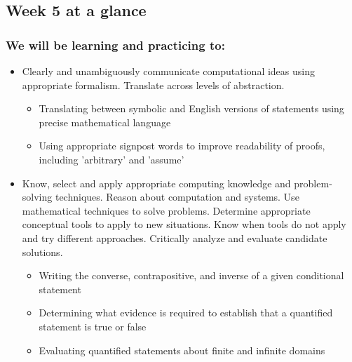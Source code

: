 

\subsection*{Week 5 at a glance}

\subsubsection*{We will be learning and practicing to:}
\begin{itemize}

\item Clearly and unambiguously communicate computational ideas using appropriate formalism. Translate across levels of abstraction.
\begin{itemize}
   \item Translating between symbolic and English versions of statements using precise mathematical language
    \item Using appropriate signpost words to improve readability of proofs, including 'arbitrary' and 'assume'
\end{itemize}

\item Know, select and apply appropriate computing knowledge and problem-solving techniques. Reason about computation and systems. Use mathematical techniques to solve problems. Determine appropriate conceptual tools to apply to new situations. Know when tools do not apply and try different approaches. Critically analyze and evaluate candidate solutions.
\begin{itemize}
    \item Writing the converse, contrapositive, and inverse of a given conditional statement
    \item Determining what evidence is required to establish that a quantified statement is true or false
    \item Evaluating quantified statements about finite and infinite domains
\end{itemize}


\end{itemize}
